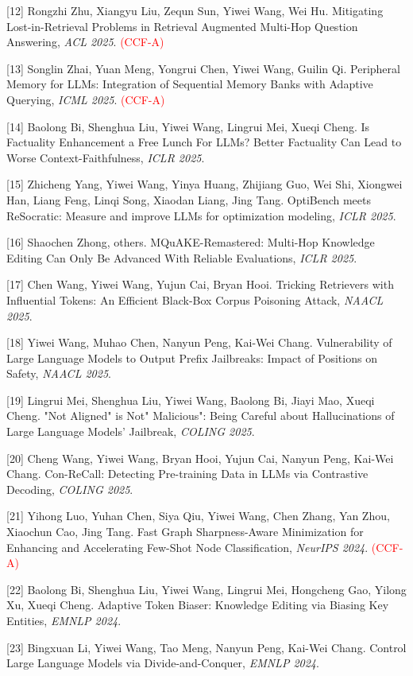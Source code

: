 [12] Rongzhi Zhu, Xiangyu Liu, Zequn Sun, Yiwei Wang, Wei Hu. Mitigating Lost-in-Retrieval Problems in Retrieval Augmented Multi-Hop Question Answering, \textit{ACL 2025}. \textcolor{red}{(CCF-A)}

[13] Songlin Zhai, Yuan Meng, Yongrui Chen, Yiwei Wang, Guilin Qi. Peripheral Memory for LLMs: Integration of Sequential Memory Banks with Adaptive Querying, \textit{ICML 2025}. \textcolor{red}{(CCF-A)}

[14] Baolong Bi, Shenghua Liu, Yiwei Wang, Lingrui Mei, Xueqi Cheng. Is Factuality Enhancement a Free Lunch For LLMs? Better Factuality Can Lead to Worse Context-Faithfulness, \textit{ICLR 2025}.

[15] Zhicheng Yang, Yiwei Wang, Yinya Huang, Zhijiang Guo, Wei Shi, Xiongwei Han, Liang Feng, Linqi Song, Xiaodan Liang, Jing Tang. OptiBench meets ReSocratic: Measure and improve LLMs for optimization modeling, \textit{ICLR 2025}.

[16] Shaochen Zhong, others. MQuAKE-Remastered: Multi-Hop Knowledge Editing Can Only Be Advanced With Reliable Evaluations, \textit{ICLR 2025}.

[17] Chen Wang, Yiwei Wang, Yujun Cai, Bryan Hooi. Tricking Retrievers with Influential Tokens: An Efficient Black-Box Corpus Poisoning Attack, \textit{NAACL 2025}.

[18] Yiwei Wang, Muhao Chen, Nanyun Peng, Kai-Wei Chang. Vulnerability of Large Language Models to Output Prefix Jailbreaks: Impact of Positions on Safety, \textit{NAACL 2025}.

[19] Lingrui Mei, Shenghua Liu, Yiwei Wang, Baolong Bi, Jiayi Mao, Xueqi Cheng. "Not Aligned" is Not" Malicious": Being Careful about Hallucinations of Large Language Models' Jailbreak, \textit{COLING 2025}.

[20] Cheng Wang, Yiwei Wang, Bryan Hooi, Yujun Cai, Nanyun Peng, Kai-Wei Chang. Con-ReCall: Detecting Pre-training Data in LLMs via Contrastive Decoding, \textit{COLING 2025}.

[21] Yihong Luo, Yuhan Chen, Siya Qiu, Yiwei Wang, Chen Zhang, Yan Zhou, Xiaochun Cao, Jing Tang. Fast Graph Sharpness-Aware Minimization for Enhancing and Accelerating Few-Shot Node Classification, \textit{NeurIPS 2024}. \textcolor{red}{(CCF-A)}

[22] Baolong Bi, Shenghua Liu, Yiwei Wang, Lingrui Mei, Hongcheng Gao, Yilong Xu, Xueqi Cheng. Adaptive Token Biaser: Knowledge Editing via Biasing Key Entities, \textit{EMNLP 2024}.

[23] Bingxuan Li, Yiwei Wang, Tao Meng, Nanyun Peng, Kai-Wei Chang. Control Large Language Models via Divide-and-Conquer, \textit{EMNLP 2024}.

